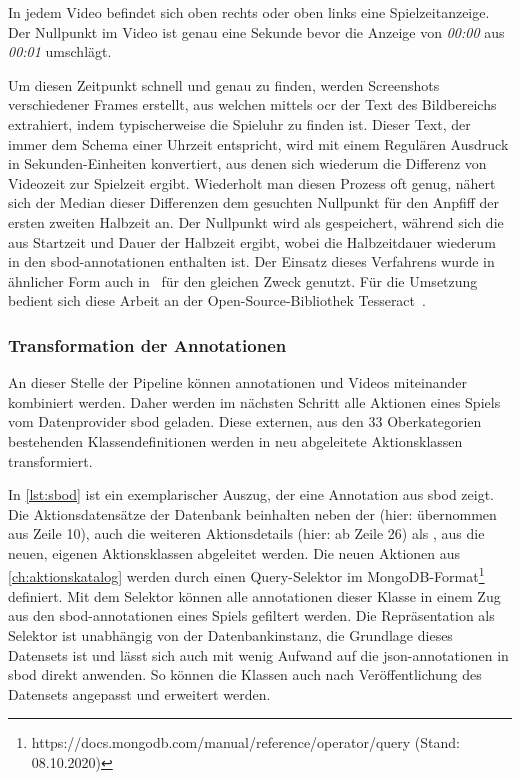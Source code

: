 In jedem Video befindet sich oben rechts oder oben links eine Spielzeitanzeige.
Der Nullpunkt im Video ist genau eine Sekunde bevor die Anzeige von \emph{00:00} aus \emph{00:01} umschlägt.

Um diesen Zeitpunkt schnell und genau zu finden, werden Screenshots verschiedener Frames erstellt, aus welchen mittels \gls{ocr} der Text des Bildbereichs extrahiert, indem typischerweise die Spieluhr zu finden ist.
Dieser Text, der immer dem Schema einer Uhrzeit entspricht, wird mit einem Regulären Ausdruck in Sekunden-Einheiten konvertiert, aus denen sich wiederum die Differenz von Videozeit zur Spielzeit ergibt.
Wiederholt man diesen Prozess oft genug, nähert sich der Median dieser Differenzen dem gesuchten Nullpunkt für den Anpfiff der ersten \bzw zweiten Halbzeit an.
Der Nullpunkt wird als  gespeichert, während sich die  aus Startzeit und Dauer der Halbzeit ergibt, wobei die Halbzeitdauer wiederum in den \gls{sbod}-\gls{annotationen} enthalten ist.
Der Einsatz dieses Verfahrens wurde in ähnlicher Form auch in~\cite{Giancola18} für den gleichen Zweck genutzt.
Für die Umsetzung bedient sich diese Arbeit an der Open-Source-Bibliothek Tesseract~\cite{Smith07}.

\subsubsection{Transformation der Annotationen}

An dieser Stelle der Pipeline können \gls{annotationen} und Videos miteinander kombiniert werden.
Daher werden im nächsten Schritt alle Aktionen eines Spiels vom Datenprovider \gls{sbod} geladen.
Diese externen, aus den 33 Oberkategorien bestehenden Klassendefinitionen werden in neu abgeleitete Aktionsklassen transformiert.

In \autoref{lst:sbod} ist ein exemplarischer Auszug, der eine Annotation aus \gls{sbod} zeigt.
Die Aktionsdatensätze der Datenbank beinhalten neben der  (hier: übernommen aus Zeile 10), auch die weiteren Aktionsdetails (hier: ab Zeile 26) als , aus die neuen, eigenen Aktionsklassen abgeleitet werden.
Die neuen Aktionen aus \autoref{ch:aktionskatalog} werden durch einen Query-Selektor im MongoDB-Format\footnote{https://docs.mongodb.com/manual/reference/operator/query (Stand: 08.10.2020)} definiert.
Mit dem Selektor können alle \gls{annotationen} dieser Klasse in einem Zug aus den \gls{sbod}-\gls{annotationen} eines Spiels gefiltert werden.
Die Repräsentation als Selektor ist unabhängig von der Datenbankinstanz, die Grundlage dieses Datensets ist und lässt sich auch mit wenig Aufwand auf die \gls{json}-\gls{annotationen} in \gls{sbod} direkt anwenden.
So können die Klassen auch nach Veröffentlichung des Datensets angepasst und erweitert werden.

